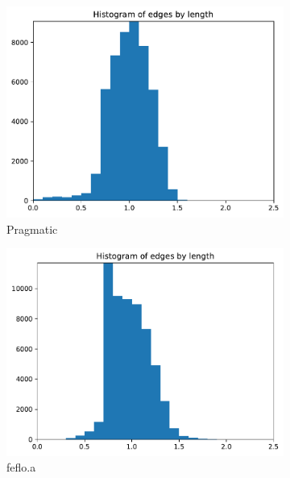 \documentclass[3p,times,procedia,number]{elsarticle}
\begin{document}
\begin{figure}
\begin{subfigure}{.16\textwidth}
\includegraphics[width=\textwidth]{pragmatic-cube-cylinder-linear-length.pdf}
\caption{Pragmatic}
\end{subfigure}
\begin{subfigure}{.16\textwidth}
\centering
\includegraphics[width=\textwidth]{fefloa-cube-cylinder-linear-length.pdf}
\caption{feflo.a}
\end{subfigure}
\begin{subfigure}{.16\textwidth}
\centering

\end{subfigure}
\end{figure}
\end{document}
